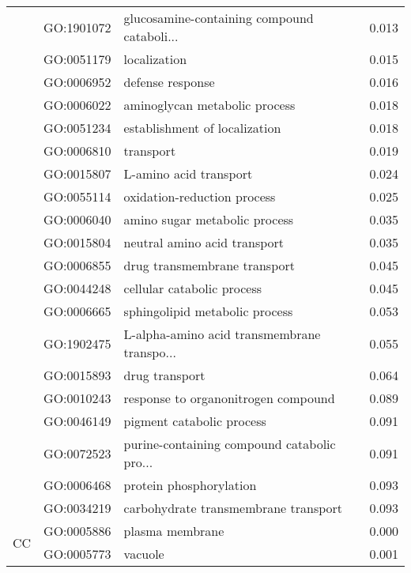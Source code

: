 \begin{longtable}{lllr}
   & GO:1901072 &  glucosamine-containing compound cataboli... &         0.013 \\
   & GO:0051179 &                                 localization &         0.015 \\
   & GO:0006952 &                             defense response &         0.016 \\
   & GO:0006022 &                aminoglycan metabolic process &         0.018 \\
   & GO:0051234 &                establishment of localization &         0.018 \\
   & GO:0006810 &                                    transport &         0.019 \\
   & GO:0015807 &                       L-amino acid transport &         0.024 \\
   & GO:0055114 &                  oxidation-reduction process &         0.025 \\
   & GO:0006040 &                amino sugar metabolic process &         0.035 \\
   & GO:0015804 &                 neutral amino acid transport &         0.035 \\
   & GO:0006855 &                 drug transmembrane transport &         0.045 \\
   & GO:0044248 &                   cellular catabolic process &         0.045 \\
   & GO:0006665 &               sphingolipid metabolic process &         0.053 \\
   & GO:1902475 &  L-alpha-amino acid transmembrane transpo... &         0.055 \\
   & GO:0015893 &                               drug transport &         0.064 \\
   & GO:0010243 &          response to organonitrogen compound &         0.089 \\
   & GO:0046149 &                    pigment catabolic process &         0.091 \\
   & GO:0072523 &  purine-containing compound catabolic pro... &         0.091 \\
   & GO:0006468 &                      protein phosphorylation &         0.093 \\
   & GO:0034219 &         carbohydrate transmembrane transport &         0.093 \\
\cline{1-4}
\multirow{15}{*}{CC} & GO:0005886 &                              plasma membrane &         0.000 \\
   & GO:0005773 &                                      vacuole &         0.001 \\

\end{longtable}
